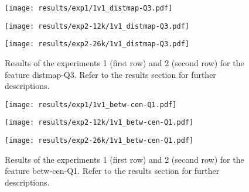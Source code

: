 \begin{figure}[h!]
	\centering
	\begin{minipage}{0.4\linewidth}
		\texttt{[image: results/exp1/1v1\_distmap-Q3.pdf]}
	\end{minipage}
	
	\begin{minipage}{0.4\linewidth}
		\texttt{[image: results/exp2-12k/1v1\_distmap-Q3.pdf]}
	\end{minipage}
	\begin{minipage}{0.4\linewidth}
		\texttt{[image: results/exp2-26k/1v1\_distmap-Q3.pdf]}
	\end{minipage}
	
	\caption[ Results: Feature distmap-Q3]{ Results of the experiments 1 (first row) and 2 (second row) for the feature distmap-Q3. Refer to the results section for further descriptions. }
	\label{fig:appendix_distmap-Q3}
\end{figure}
\newpage 


\begin{figure}[h!]
	\centering
	\begin{minipage}{0.4\linewidth}
		\texttt{[image: results/exp1/1v1\_betw-cen-Q1.pdf]}
	\end{minipage}
	
	\begin{minipage}{0.4\linewidth}
		\texttt{[image: results/exp2-12k/1v1\_betw-cen-Q1.pdf]}
	\end{minipage}
	\begin{minipage}{0.4\linewidth}
		\texttt{[image: results/exp2-26k/1v1\_betw-cen-Q1.pdf]}
	\end{minipage}
	
	\caption[ Results: Feature betw-cen-Q1]{ Results of the experiments 1 (first row) and 2 (second row) for the feature betw-cen-Q1. Refer to the results section for further descriptions. }
	\label{fig:appendix_betw-cen-Q1}
\end{figure}

